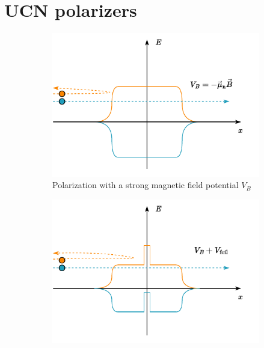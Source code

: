 
\section{UCN polarizers}\label{sec:ucn_polarizers}


\begin{figure}
\centering
\begin{subfigure}{.5\textwidth} 
  \centering
  \includegraphics[width=\textwidth]{figures/ucn_polarization_1.pdf}
  \caption{Polarization with a strong magnetic field \newline potential $V_B$}\label{subfig:polarization_solenoid}
\end{subfigure}%
\begin{subfigure}{.5\textwidth}
  \centering
  \includegraphics[width=\textwidth]{figures/ucn_polarization_2.pdf}

\end{subfigure}
\end{figure}
